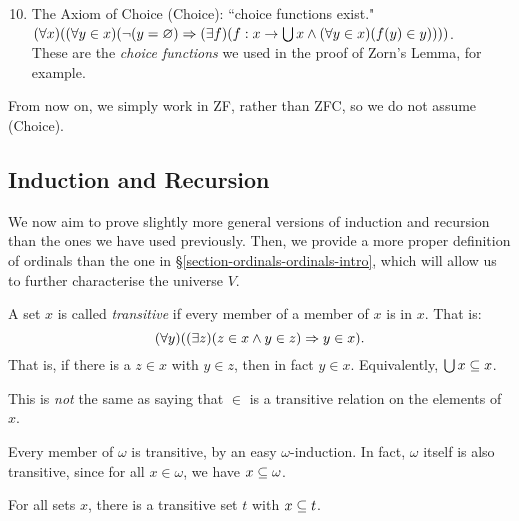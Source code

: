 \documentclass{article}
\begin{document}
\begin{enumerate}
	\setcounter{enumi}{9}
    \item The Axiom of Choice (Choice): ``choice functions exist." \\
    $(\forall x)((\forall y \in x)(\lnot(y = \varnothing) \Rightarrow (\exists f)(f : x \to \bigcup x \land (\forall y \in x)(f(y) \in y))))$. \\
    These are the \textit{choice functions} we used in the proof of Zorn's Lemma, for example.
\end{enumerate}

\begin{note}
	From now on, we simply work in ZF, rather than ZFC, so we do not assume (Choice).
\end{note}


\subsection{Induction and Recursion}
\label{section-set-theory-induction-recursion}

We now aim to prove slightly more general versions of induction and recursion than the ones we have used previously. Then, we provide a more proper definition of ordinals than the one in \S\ref{section-ordinals-ordinals-intro}, which will allow us to further characterise the universe $V$.

\begin{definition}
    A set $x$ is called \textit{transitive} if every member of a member of $x$ is in $x$. That is:
    \[
	(\forall y)((\exists z)(z \in x \land y \in z) \Rightarrow y \in x).
	\]
	That is, if there is a $z \in x$ with $y \in z$, then in fact $y \in x$. Equivalently, $\bigcup x \subseteq x$.
\end{definition}

\begin{note}
	This is \textit{not} the same as saying that $\in$ is a transitive relation on the elements of $x$.
\end{note}

Every member of $\omega$ is transitive, by an easy $\omega$-induction. In fact, $\omega$ itself is also transitive, since for all $x \in \omega$, we have $x \subseteq \omega$.

\begin{proposition}
	For all sets $x$, there is a transitive set $t$ with $x \subseteq t$.
\end{proposition}
\end{document}
